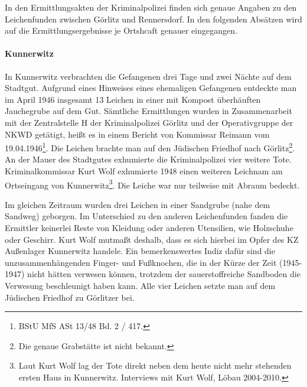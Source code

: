In den Ermittlungsakten der Kriminalpolizei finden sich genaue Angaben zu den Leichenfunden zwischen Görlitz und Rennersdorf. In den folgenden Absätzen wird auf die Ermittlungsergebnisse je Ortshcaft genauer eingegangen.  

\paragraph{Kunnerwitz\label{kunnerwitz}}


In Kunnerwitz verbrachten die Gefangenen drei Tage und zwei Nächte auf dem Stadtgut. Aufgrund eines Hinweises eines ehemaligen Gefangenen entdeckte man im April 1946 insgesamt 13 Leichen in einer mit Kompost überhäuften Jauchegrube auf dem Gut. \glqq Sämtliche Ermittlungen wurden in Zusammenarbeit mit der Zentralstelle H der Kriminalpolizei Görlitz und der Operativgruppe der NKWD getätigt\grqq, heißt es in einem Bericht von Kommissar Reimann vom 19.04.1946\footnote{BStU MfS ASt 13/48 Bd. 2 / 417.}. Die Leichen brachte man auf den Jüdischen Friedhof nach Görlitz\footnote{Die genaue Grabstätte ist nicht bekannt.}.
\newline
An der Mauer des Stadtgutes exhumierte die Kriminalpolizei vier weitere Tote.
Kriminalkommissar Kurt Wolf exhumierte 1948 einen weiteren Leichnam am Ortseingang von Kunnerwitz\footnote{Laut Kurt Wolf lag der Tote direkt neben dem heute nicht mehr stehenden ersten Haus in Kunnerwitz. Interviews mit Kurt Wolf, Löbau 2004-2010.}. Die Leiche war nur teilweise mit Abraum bedeckt. 

Im gleichen Zeitraum wurden drei Leichen in einer Sandgrube (nahe dem Sandweg) geborgen. Im Unterschied zu den anderen Leichenfunden fanden die Ermittler keinerlei Reste von Kleidung oder anderen Utensilien, wie Holzschuhe oder Geschirr. Kurt Wolf mutmaßt deshalb, dass es sich hierbei im Opfer des KZ Außenlager Kunnerwitz handele. Ein bemerkenswertes Indiz dafür sind die unzusammenhängenden Finger- und Fußknochen, die in der Kürze der Zeit (1945-1947) nicht hätten verwesen können, trotzdem der sauerstoffreiche Sandboden die Verwesung beschleunigt haben kann. Alle vier Leichen setzte man auf dem Jüdischen Friedhof zu Görlitzer bei.
 

